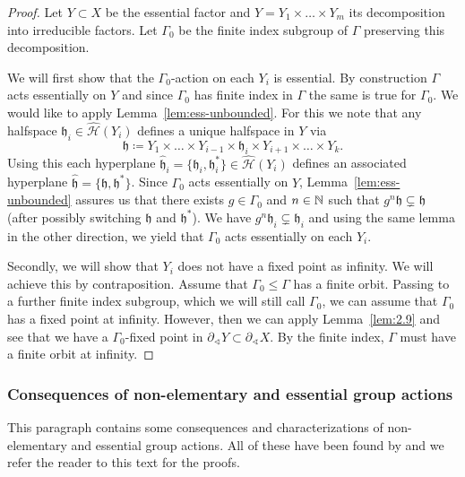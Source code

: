 \begin{proof}
  Let \(Y \subset X\) be the essential factor and \(Y = Y_1 \times \dots \times Y_m\) its decomposition into irreducible factors. Let \(\Gamma_0\) be the finite index subgroup of \(\Gamma\) preserving this decomposition.

  We will first show that the \(\Gamma_0\)-action on each \(Y_i\) is essential. By construction \(\Gamma\) acts essentially on \(Y\) and since \(\Gamma_0\) has finite index in \(\Gamma\) the same is true for \(\Gamma_0\). We would like to apply Lemma~\ref{lem:ess-unbounded}. For this we note that any halfspace \(\mathfrak{h}_i \in \mathcal{\hat H}(Y_i)\) defines a unique halfspace in \(Y\) via
  \[
    \mathfrak{h} \coloneqq Y_1 \times \dots \times Y_{i-1} \times \mathfrak{h}_i \times Y_{i+1} \times \dots \times Y_k.
  \]
  Using this each hyperplane \(\mathfrak{\hat h}_i = \{\mathfrak{h}_i , \mathfrak{h}_i^\ast\} \in \mathcal{\hat H}(Y_i)\) defines an associated hyperplane \(\mathfrak{\hat h} = \{\mathfrak{h}, \mathfrak{h}^\ast\}\). Since \(\Gamma_0\) acts essentially on \(Y\), Lemma~\ref{lem:ess-unbounded} assures us that there exists \(g \in \Gamma_0\) and \(n \in \mathbb{N}\) such that \(g^n \mathfrak{h} \subsetneq \mathfrak{h}\) (after possibly switching \(\mathfrak{h}\) and \(\mathfrak{h}^\ast\)). We have \(g^n \mathfrak{h}_i \subsetneq \mathfrak{h}_i\) and using the same lemma in the other direction, we yield that \(\Gamma_0\) acts essentially on each \(Y_i\).

  Secondly, we will show that \(Y_i\) does not have a fixed point as infinity. We will achieve this by contraposition. Assume that \(\Gamma_0 \leq \Gamma\) has a finite orbit. Passing to a further finite index subgroup, which we will still call \(\Gamma_0\), we can assume that \(\Gamma_0\) has a fixed point at infinity. However, then we can apply Lemma~\ref{lem:2.9} and see that we have a \(\Gamma_0\)-fixed point in \(\partial_\sphericalangle Y \subset \partial_\sphericalangle X\). By the finite index, \(\Gamma\) must have a finite orbit at infinity.
\end{proof}

\subsubsection*{Consequences of non-elementary and essential group actions}
\label{cons-non-el-ess}

This paragraph contains some consequences and characterizations of non-elementary and essential group actions. All of these have been found by \textcite{Caprace2010} and we refer the reader to this text for the proofs.

